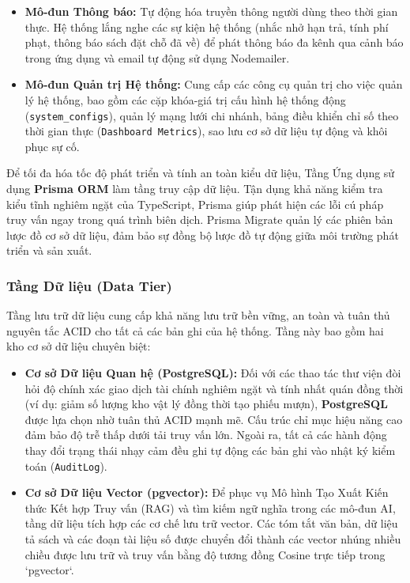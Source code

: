 \begin{itemize}
	\item \textbf{Mô-đun Thông báo:} Tự động hóa truyền thông người dùng theo thời gian thực. Hệ thống lắng nghe các sự kiện hệ thống (nhắc nhở hạn trả, tính phí phạt, thông báo sách đặt chỗ đã về) để phát thông báo đa kênh qua cảnh báo trong ứng dụng và email tự động sử dụng Nodemailer.

	\item \textbf{Mô-đun Quản trị Hệ thống:} Cung cấp các công cụ quản trị cho việc quản lý hệ thống, bao gồm các cặp khóa-giá trị cấu hình hệ thống động (\texttt{system\_configs}), quản lý mạng lưới chi nhánh, bảng điều khiển chỉ số theo thời gian thực (\texttt{Dashboard Metrics}), sao lưu cơ sở dữ liệu tự động và khôi phục sự cố.
\end{itemize}

Để tối đa hóa tốc độ phát triển và tính an toàn kiểu dữ liệu, Tầng Ứng dụng sử dụng \textbf{Prisma ORM} làm tầng truy cập dữ liệu. Tận dụng khả năng kiểm tra kiểu tĩnh nghiêm ngặt của TypeScript, Prisma giúp phát hiện các lỗi cú pháp truy vấn ngay trong quá trình biên dịch. Prisma Migrate quản lý các phiên bản lược đồ cơ sở dữ liệu, đảm bảo sự đồng bộ lược đồ tự động giữa môi trường phát triển và sản xuất.

\subsubsection{Tầng Dữ liệu (Data Tier)}
Tầng lưu trữ dữ liệu cung cấp khả năng lưu trữ bền vững, an toàn và tuân thủ nguyên tắc ACID cho tất cả các bản ghi của hệ thống. Tầng này bao gồm hai kho cơ sở dữ liệu chuyên biệt:

\begin{itemize}
	\item \textbf{Cơ sở Dữ liệu Quan hệ (PostgreSQL):} Đối với các thao tác thư viện đòi hỏi độ chính xác giao dịch tài chính nghiêm ngặt và tính nhất quán đồng thời (ví dụ: giảm số lượng kho vật lý đồng thời tạo phiếu mượn), \textbf{PostgreSQL} được lựa chọn nhờ tuân thủ ACID mạnh mẽ. Cấu trúc chỉ mục hiệu năng cao đảm bảo độ trễ thấp dưới tải truy vấn lớn. Ngoài ra, tất cả các hành động thay đổi trạng thái nhạy cảm đều ghi tự động các bản ghi vào nhật ký kiểm toán (\texttt{AuditLog}).

	\item \textbf{Cơ sở Dữ liệu Vector (pgvector):} Để phục vụ Mô hình Tạo Xuất Kiến thức Kết hợp Truy vấn (RAG) và tìm kiếm ngữ nghĩa trong các mô-đun AI, tầng dữ liệu tích hợp các cơ chế lưu trữ vector. Các tóm tắt văn bản, dữ liệu tả sách và các đoạn tài liệu số được chuyển đổi thành các vector nhúng nhiều chiều được lưu trữ và truy vấn bằng độ tương đồng Cosine trực tiếp trong `pgvector`.
\end{itemize}

